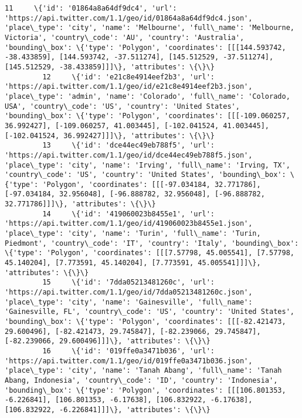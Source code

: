 \documentclass[11pt]{article}
\begin{document}
\begin{Verbatim}[commandchars=\\\{\}]
         11     \{'id': '01864a8a64df9dc4', 'url': 'https://api.twitter.com/1.1/geo/id/01864a8a64df9dc4.json', 'place\_type': 'city', 'name': 'Melbourne', 'full\_name': 'Melbourne, Victoria', 'country\_code': 'AU', 'country': 'Australia', 'bounding\_box': \{'type': 'Polygon', 'coordinates': [[[144.593742, -38.433859], [144.593742, -37.511274], [145.512529, -37.511274], [145.512529, -38.433859]]]\}, 'attributes': \{\}\}               
         12     \{'id': 'e21c8e4914eef2b3', 'url': 'https://api.twitter.com/1.1/geo/id/e21c8e4914eef2b3.json', 'place\_type': 'admin', 'name': 'Colorado', 'full\_name': 'Colorado, USA', 'country\_code': 'US', 'country': 'United States', 'bounding\_box': \{'type': 'Polygon', 'coordinates': [[[-109.060257, 36.992427], [-109.060257, 41.003445], [-102.041524, 41.003445], [-102.041524, 36.992427]]]\}, 'attributes': \{\}\}                 
         13     \{'id': 'dce44ec49eb788f5', 'url': 'https://api.twitter.com/1.1/geo/id/dce44ec49eb788f5.json', 'place\_type': 'city', 'name': 'Irving', 'full\_name': 'Irving, TX', 'country\_code': 'US', 'country': 'United States', 'bounding\_box': \{'type': 'Polygon', 'coordinates': [[[-97.034184, 32.771786], [-97.034184, 32.956048], [-96.888782, 32.956048], [-96.888782, 32.771786]]]\}, 'attributes': \{\}\}                           
         14     \{'id': '419060023b8455e1', 'url': 'https://api.twitter.com/1.1/geo/id/419060023b8455e1.json', 'place\_type': 'city', 'name': 'Turin', 'full\_name': 'Turin, Piedmont', 'country\_code': 'IT', 'country': 'Italy', 'bounding\_box': \{'type': 'Polygon', 'coordinates': [[[7.57798, 45.005541], [7.57798, 45.140204], [7.773591, 45.140204], [7.773591, 45.005541]]]\}, 'attributes': \{\}\}                                         
         15     \{'id': '7dda05213481260c', 'url': 'https://api.twitter.com/1.1/geo/id/7dda05213481260c.json', 'place\_type': 'city', 'name': 'Gainesville', 'full\_name': 'Gainesville, FL', 'country\_code': 'US', 'country': 'United States', 'bounding\_box': \{'type': 'Polygon', 'coordinates': [[[-82.421473, 29.600496], [-82.421473, 29.745847], [-82.239066, 29.745847], [-82.239066, 29.600496]]]\}, 'attributes': \{\}\}                 
         16     \{'id': '019ffe0a3471b036', 'url': 'https://api.twitter.com/1.1/geo/id/019ffe0a3471b036.json', 'place\_type': 'city', 'name': 'Tanah Abang', 'full\_name': 'Tanah Abang, Indonesia', 'country\_code': 'ID', 'country': 'Indonesia', 'bounding\_box': \{'type': 'Polygon', 'coordinates': [[[106.801353, -6.226841], [106.801353, -6.17638], [106.832922, -6.17638], [106.832922, -6.226841]]]\}, 'attributes': \{\}\}                

\end{Verbatim}
\end{document}
